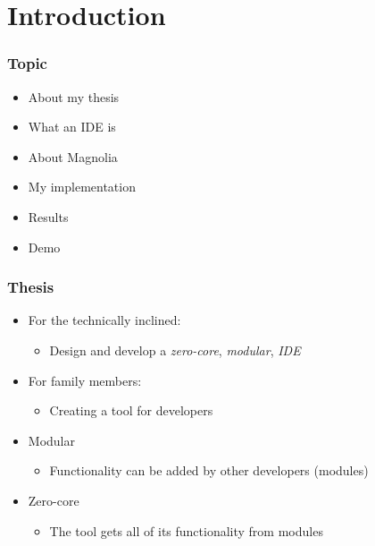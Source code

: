 \section{Introduction}
\SectionPage

\begin{frame}
  \frametitle{Topic}
  \begin{itemize}
    \item About my thesis
      \pause
    \item What an IDE is
      \pause
    \item About Magnolia
      \pause
    \item My implementation
      \pause
    \item Results
      \pause
    \item Demo
  \end{itemize}
\end{frame}

\begin{frame}
  \frametitle{Thesis}
  \begin{itemize}
      \pause
    \item For the technically inclined:
      \begin{itemize}
        \item Design and develop a \textit{zero-core}, \textit{modular}, \textit{IDE} 
      \end{itemize}
      \pause
    \item For family members:
      \pause
      \begin{itemize}
        \item Creating a tool for developers
      \end{itemize}
      \pause
    \item Modular
      \pause
      \begin{itemize}
        \item Functionality can be added by other developers (modules)
      \end{itemize}
      \pause
    \item Zero-core
      \pause
      \begin{itemize}
        \item The tool gets all of its functionality from modules
      \end{itemize}
  \end{itemize}
\end{frame}

